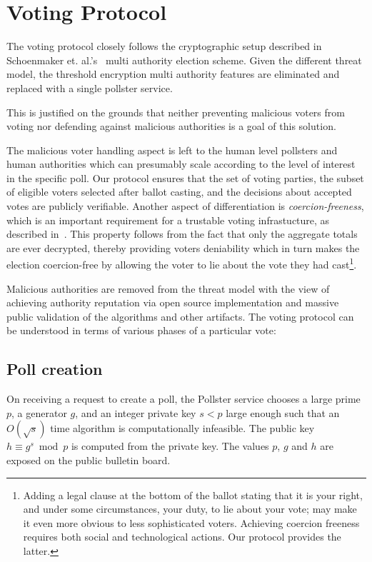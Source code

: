 
\section{Voting Protocol}

The voting protocol closely follows the cryptographic
setup described in Schoenmaker et. al.'s~\cite{Cramer:1997:SOE:1754542.1754554}
multi authority election scheme.  Given the different threat model,
the threshold encryption multi authority features are eliminated
and replaced with a single pollster service.

This is justified on the grounds that neither preventing malicious voters from
voting nor defending against malicious authorities is a
goal of this solution.

The malicious voter handling aspect is left to the human level pollsters
and human authorities which can presumably scale according to the level
of interest in the specific poll.
Our protocol ensures that the set of voting parties, the subset of eligible
voters selected after ballot casting, and the decisions about
accepted votes are publicly verifiable.
Another aspect of differentiation is \emph{coercion-freeness}, which
is an important requirement for a trustable voting infrastucture,
as described in~\cite{Karlof:2005:CVP:1251398.1251401}.
This property follows from the fact that only the aggregate totals are ever
decrypted, thereby providing voters deniability which in turn makes the
election coercion-free by allowing the voter to lie about the vote
they had cast\footnote{Adding a legal clause at the bottom of the
  ballot stating that it is your right, and under some circumstances,
  your duty, to lie about your vote;
  may make it even more obvious to less sophisticated voters.  Achieving
  coercion freeness requires both social and technological actions.  Our protocol
  provides the latter.}.

Malicious authorities are removed from the threat model with the view
of achieving authority reputation via open source implementation and massive
public validation of the algorithms and other artifacts.
The voting protocol can be understood in terms of various phases of a
particular vote:

\subsection{Poll creation}
On receiving a request to create a poll, the Pollster service
chooses a large prime $p$, a generator $g$, and an integer private key $s < p$
large enough such that an $O(\sqrt s)$ time algorithm is computationally
infeasible.
The public key $h \equiv g^s\bmod p$ is computed from the private key.
The values $p$, $g$ and $h$
are exposed on the public bulletin board.

